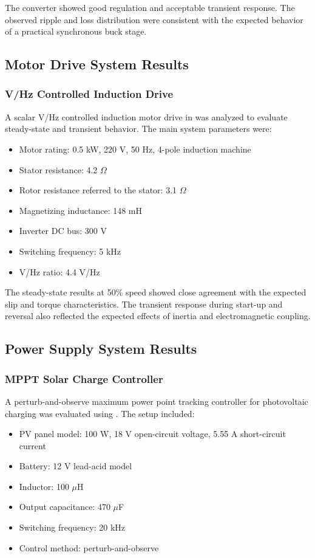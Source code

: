 The converter showed good regulation and acceptable transient response. The observed ripple and loss distribution were consistent with the expected behavior of a practical synchronous buck stage.

\subsection{Motor Drive System Results}
\subsubsection{V/Hz Controlled Induction Drive}
A scalar V/Hz controlled induction motor drive in  was analyzed to evaluate steady-state and transient behavior. The main system parameters were:
\begin{itemize}
    \item Motor rating: 0.5 kW, 220 V, 50 Hz, 4-pole induction machine
    \item Stator resistance: 4.2 $\Omega$
    \item Rotor resistance referred to the stator: 3.1 $\Omega$
    \item Magnetizing inductance: 148 mH
    \item Inverter DC bus: 300 V
    \item Switching frequency: 5 kHz
    \item V/Hz ratio: 4.4 V/Hz
\end{itemize}

The steady-state results at 50\% speed showed close agreement with the expected slip and torque characteristics. The transient response during start-up and reversal also reflected the expected effects of inertia and electromagnetic coupling.

\subsection{Power Supply System Results}
\subsubsection{MPPT Solar Charge Controller}
A perturb-and-observe maximum power point tracking controller for photovoltaic charging was evaluated using . The setup included:
\begin{itemize}
    \item PV panel model: 100 W, 18 V open-circuit voltage, 5.55 A short-circuit current
    \item Battery: 12 V lead-acid model
    \item Inductor: 100 $\mu$H
    \item Output capacitance: 470 $\mu$F
    \item Switching frequency: 20 kHz
    \item Control method: perturb-and-observe
\end{itemize}

